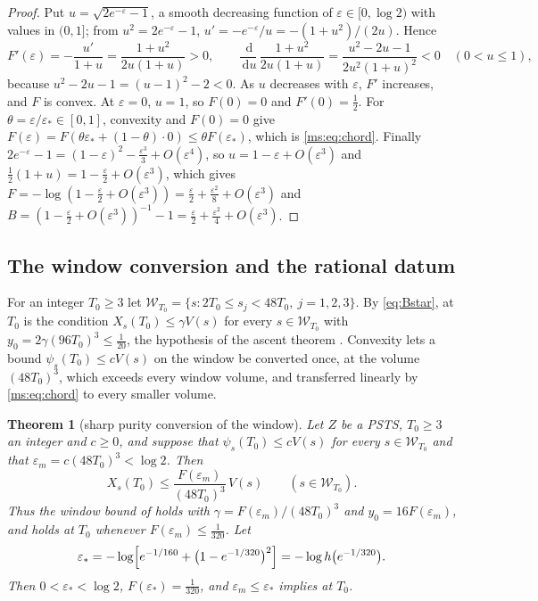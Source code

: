\documentclass[11pt,a4paper]{amsart}
\newtheorem{theorem}{Theorem}[section]
\theoremstyle{definition}
\theoremstyle{remark}
\numberwithin{equation}{section}
\newcommand{\Wwin}{\mathcal{W}}      %
\newcommand{\dd}{\,\mathrm{d}}             %
\newcommand{\PSTS}{\textup{PSTS}}          %
\newcommand{\TT}{\mathbb{T}}               %
\newcommand{\Zc}{\mathcal{Z}}              %
\newcommand{\XT}[2]{X_{#1}(#2)}            %
\newcommand{\psiT}[2]{\psi_{#1}(#2)}       %
\newcommand{\Vol}[1]{V(#1)}                %
\newcommand{\Bstar}{\text{\upshape(B$^{*}$)}}       %
\begin{document}
\begin{proof}
Put $u=\sqrt{2e^{-\varepsilon}-1}$, a smooth decreasing function of $\varepsilon\in[0,\log2)$ with values in $(0,1]$; from $u^2=2e^{-\varepsilon}-1$, $u'=-e^{-\varepsilon}/u=-(1+u^2)/(2u)$. Hence
\[
F'(\varepsilon)=-\frac{u'}{1+u}=\frac{1+u^2}{2u(1+u)}>0,\qquad \frac{\dd}{\dd u}\,\frac{1+u^2}{2u(1+u)}=\frac{u^2-2u-1}{2u^2(1+u)^2}<0\quad(0<u\le1),
\]
because $u^2-2u-1=(u-1)^2-2<0$. As $u$ decreases with $\varepsilon$, $F'$ increases, and $F$ is convex. At $\varepsilon=0$, $u=1$, so $F(0)=0$ and $F'(0)=\frac12$. For $\theta=\varepsilon/\varepsilon_*\in[0,1]$, convexity and $F(0)=0$ give $F(\varepsilon)=F(\theta\varepsilon_*+(1-\theta)\cdot0)\le\theta F(\varepsilon_*)$, which is \eqref{ms:eq:chord}. Finally $2e^{-\varepsilon}-1=(1-\varepsilon)^2-\frac{\varepsilon^3}3+O(\varepsilon^4)$, so $u=1-\varepsilon+O(\varepsilon^3)$ and $\frac12(1+u)=1-\frac\varepsilon2+O(\varepsilon^3)$, which gives $F=-\log(1-\frac\varepsilon2+O(\varepsilon^3))=\frac\varepsilon2+\frac{\varepsilon^2}8+O(\varepsilon^3)$ and $B=(1-\frac\varepsilon2+O(\varepsilon^3))^{-1}-1=\frac\varepsilon2+\frac{\varepsilon^2}4+O(\varepsilon^3)$.
\end{proof}

\subsection{The window conversion and the rational datum}

For an integer $T_0\ge3$ let $\Wwin_{T_0}=\{s:2T_0\le s_j<48T_0,\ j=1,2,3\}$. By \eqref{eq:Bstar}, \Bstar{} at $T_0$ is the condition $\XT{s}{T_0}\le\gamma\Vol{s}$ for every $s\in\Wwin_{T_0}$ with $y_0=2\gamma(96T_0)^3\le\frac1{20}$, the hypothesis of the ascent theorem \cite[Theorem~7]{bhattacharjee2026first}. Convexity lets a bound $\psiT{s}{T_0}\le c\Vol{s}$ on the window be converted once, at the volume $(48T_0)^3$, which exceeds every window volume, and transferred linearly by \eqref{ms:eq:chord} to every smaller volume.

\begin{theorem}[sharp purity conversion of the window]\label{ms:thm:window}
Let $Z$ be a \PSTS{}, $T_0\ge3$ an integer and $c\ge0$, and suppose that $\psiT{s}{T_0}\le c\Vol{s}$ for every $s\in\Wwin_{T_0}$ and that $\varepsilon_m=c(48T_0)^3<\log2$. Then
\begin{equation}\label{ms:eq:improved-pressure}
\XT{s}{T_0}\le\frac{F(\varepsilon_m)}{(48T_0)^3}\,\Vol{s}\qquad(s\in\Wwin_{T_0}).
\end{equation}
Thus the window bound of \Bstar{} holds with $\gamma=F(\varepsilon_m)/(48T_0)^3$ and $y_0=16F(\varepsilon_m)$, and \Bstar{} holds at $T_0$ whenever $F(\varepsilon_m)\le\frac1{320}$. Let
\[
\varepsilon_*=-\log\Bigl[e^{-1/160}+\bigl(1-e^{-1/320}\bigr)^2\Bigr]=-\log h\bigl(e^{-1/320}\bigr).
\]
Then $0<\varepsilon_*<\log2$, $F(\varepsilon_*)=\frac1{320}$, and $\varepsilon_m\le\varepsilon_*$ implies \Bstar{} at $T_0$.
\end{theorem}
\end{document}
